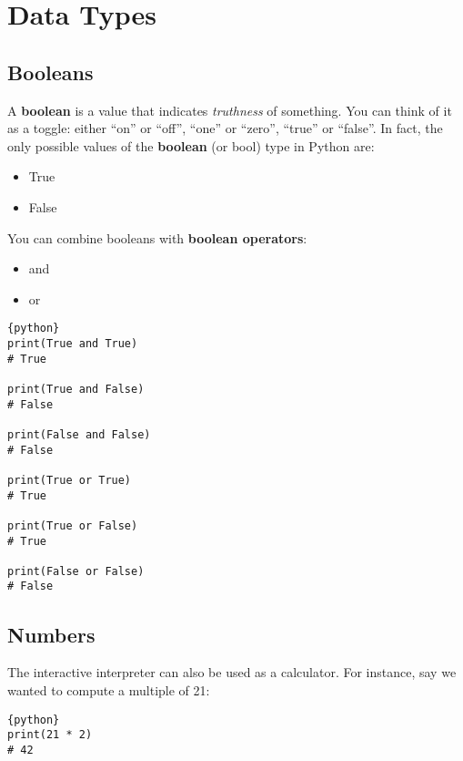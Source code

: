 \section{Data Types}\label{data-types}

\subsection{Booleans}\label{booleans}

A \textbf{boolean} is a value that indicates \emph{truthness} of
something. You can think of it as a toggle: either ``on'' or ``off'',
``one'' or ``zero'', ``true'' or ``false''. In fact, the only possible
values of the \textbf{boolean} (or bool) type in Python are:

\begin{itemize}
\tightlist
\item
  True
\item
  False
\end{itemize}

You can combine booleans with \textbf{boolean operators}:

\begin{itemize}
\tightlist
\item
  and
\item
  or
\end{itemize}

\begin{lstlisting}{python}
print(True and True)
# True

print(True and False)
# False

print(False and False)
# False

print(True or True)
# True

print(True or False)
# True

print(False or False)
# False
\end{lstlisting}

\subsection{Numbers}\label{numbers}

The interactive interpreter can also be used as a calculator. For
instance, say we wanted to compute a multiple of 21:

\begin{lstlisting}{python}
print(21 * 2)
# 42
\end{lstlisting}

